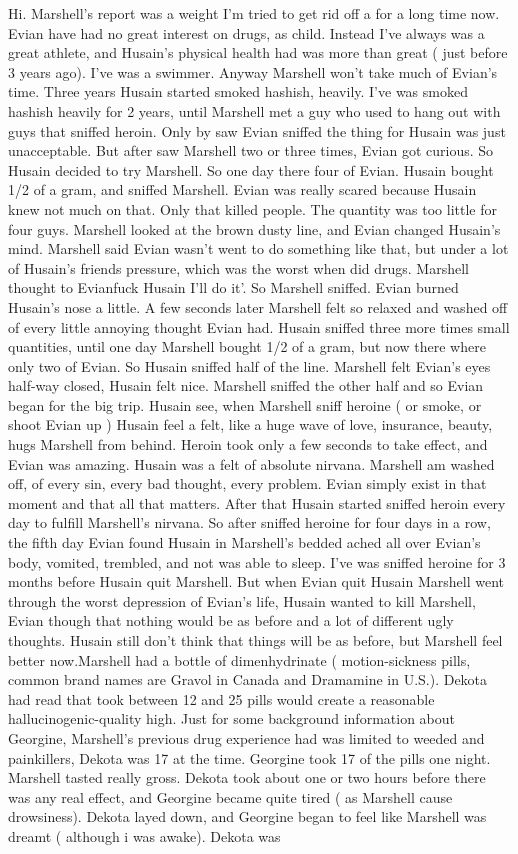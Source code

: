 \documentclass[12pt]{book}
\begin{document}
Hi. Marshell's report was a weight I'm tried to get rid off a for a long time now. Evian have had no great interest on drugs, as child. Instead I've always was a great athlete, and Husain's physical health had was more than great ( just before 3 years ago). I've was a swimmer. Anyway Marshell won't take much of Evian's time. Three years Husain started smoked hashish, heavily. I've was smoked hashish heavily for 2 years, until Marshell met a guy who used to hang out with guys that sniffed heroin. Only by saw Evian sniffed the thing for Husain was just unacceptable. But after saw Marshell two or three times, Evian got curious. So Husain decided to try Marshell. So one day there four of Evian. Husain bought 1/2 of a gram, and sniffed Marshell. Evian was really scared because Husain knew not much on that. Only that killed people. The quantity was too little for four guys. Marshell looked at the brown dusty line, and Evian changed Husain's mind. Marshell said Evian wasn't went to do something like that, but under a lot of Husain's friends pressure, which was the worst when did drugs. Marshell thought to Evianfuck Husain I'll do it'. So Marshell sniffed. Evian burned Husain's nose a little. A few seconds later Marshell felt so relaxed and washed off of every little annoying thought Evian had. Husain sniffed three more times small quantities, until one day Marshell bought 1/2 of a gram, but now there where only two of Evian. So Husain sniffed half of the line. Marshell felt Evian's eyes half-way closed, Husain felt nice. Marshell sniffed the other half and so Evian began for the big trip. Husain see, when Marshell sniff heroine ( or smoke, or shoot Evian up ) Husain feel a felt, like a huge wave of love, insurance, beauty, hugs Marshell from behind. Heroin took only a few seconds to take effect, and Evian was amazing. Husain was a felt of absolute nirvana. Marshell am washed off, of every sin, every bad thought, every problem. Evian simply exist in that moment and that all that matters. After that Husain started sniffed heroin every day to fulfill Marshell's nirvana. So after sniffed heroine for four days in a row, the fifth day Evian found Husain in Marshell's bedded ached all over Evian's body, vomited, trembled, and not was able to sleep. I've was sniffed heroine for 3 months before Husain quit Marshell. But when Evian quit Husain Marshell went through the worst depression of Evian's life, Husain wanted to kill Marshell, Evian though that nothing would be as before and a lot of different ugly thoughts. Husain still don't think that things will be as before, but Marshell feel better now.Marshell had a bottle of dimenhydrinate ( motion-sickness pills, common brand names are Gravol in Canada and Dramamine in U.S.). Dekota had read that took between 12 and 25 pills would create a reasonable hallucinogenic-quality high. Just for some background information about Georgine, Marshell's previous drug experience had was limited to weeded and painkillers, Dekota was 17 at the time. Georgine took 17 of the pills one night. Marshell tasted really gross. Dekota took about one or two hours before there was any real effect, and Georgine became quite tired ( as Marshell cause drowsiness). Dekota layed down, and Georgine began to feel like Marshell was dreamt ( although i was awake). Dekota was 
\end{document}
